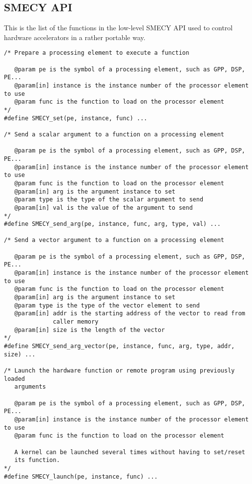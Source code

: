 \documentclass[a4paper]{article}
\begin{document}
	\subsection{SMECY API}
	This is the list of the functions in the low-level SMECY API
    \cite{smec} used to control hardware accelerators in a rather portable
    way.
	\begin{lstlisting}[frame=none,numbers=none]
/* Prepare a processing element to execute a function

   @param pe is the symbol of a processing element, such as GPP, DSP, PE...
   @param[in] instance is the instance number of the processor element to use
   @param func is the function to load on the processor element
*/
#define SMECY_set(pe, instance, func) ...

/* Send a scalar argument to a function on a processing element

   @param pe is the symbol of a processing element, such as GPP, DSP, PE...
   @param[in] instance is the instance number of the processor element to use
   @param func is the function to load on the processor element
   @param[in] arg is the argument instance to set
   @param type is the type of the scalar argument to send
   @param[in] val is the value of the argument to send
*/
#define SMECY_send_arg(pe, instance, func, arg, type, val) ...

/* Send a vector argument to a function on a processing element

   @param pe is the symbol of a processing element, such as GPP, DSP, PE...
   @param[in] instance is the instance number of the processor element to use
   @param func is the function to load on the processor element
   @param[in] arg is the argument instance to set
   @param type is the type of the vector element to send
   @param[in] addr is the starting address of the vector to read from
              caller memory
   @param[in] size is the length of the vector
*/
#define SMECY_send_arg_vector(pe, instance, func, arg, type, addr, size) ...

/* Launch the hardware function or remote program using previously loaded
   arguments

   @param pe is the symbol of a processing element, such as GPP, DSP, PE...
   @param[in] instance is the instance number of the processor element to use
   @param func is the function to load on the processor element

   A kernel can be launched several times without having to set/reset
   its function.
*/
#define SMECY_launch(pe, instance, func) ...


\end{lstlisting}
\end{document}
